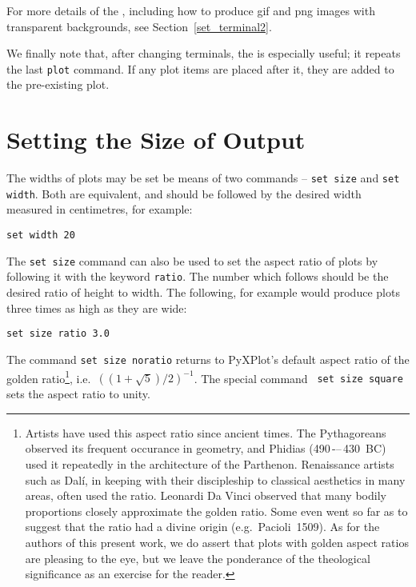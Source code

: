 For more details of the , including how to produce gif
and png images with transparent backgrounds, see Section~\ref{set_terminal2}.

We finally note that, after changing terminals, the  is
especially useful; it repeats the last {\tt plot} command. If any plot items
are placed after it, they are added to the pre-existing plot.

\section{Setting the Size of Output}

The widths of plots may be set be means of two commands -- {\tt set
size} and {\tt set width}. Both are
equivalent, and should be followed by the desired width measured in
centimetres, for example:

\begin{verbatim}
set width 20
\end{verbatim}

The {\tt set size} command can also be used to set the aspect ratio of plots by
following it with the keyword {\tt ratio}. The number
which follows should be the desired ratio of height to width. The following,
for example would produce plots three times as high as they are wide:

\begin{verbatim}
set size ratio 3.0
\end{verbatim}

The command {\tt set size noratio} returns to PyXPlot's default aspect ratio of
the golden ratio\footnote{Artists have used this aspect ratio since ancient
times. The Pythagoreans observed its frequent occurance in geometry, and
Phidias (490\,-–\,430~{\scriptsize BC}) used it repeatedly in the architecture
of the Parthenon. Renaissance artists such as Dal\'i, in keeping with their
discipleship to classical aesthetics in many areas, often used the ratio.
Leonardi Da Vinci observed that many bodily proportions closely approximate the
golden ratio. Some even went so far as to suggest that the ratio had a divine
origin (e.g.\ Pacioli~1509). As for the authors of this present work, we do
assert that plots with golden aspect ratios are pleasing to the eye, but we
leave the ponderance of the theological significance as an exercise for the
reader.}, i.e.\ $\left((1+\sqrt{5})/2\right)^{-1}$. The special command {\tt
set size square} sets the aspect ratio to unity.

